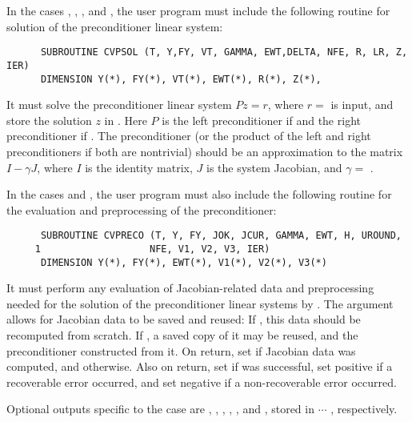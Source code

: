 \begin{enumerate}
\begin{itemize}
    In the cases , , , and , 
    the user program must include the following routine for solution of the preconditioner
    linear system:
\begin{verbatim}
      SUBROUTINE CVPSOL (T, Y,FY, VT, GAMMA, EWT,DELTA, NFE, R, LR, Z, IER)
      DIMENSION Y(*), FY(*), VT(*), EWT(*), R(*), Z(*),
\end{verbatim}
    It must solve the preconditioner linear system $Pz = r$, where $r =$  
    is input, and store the solution $z$ in . Here $P$ is the left 
    preconditioner if  and the right preconditioner if .  
    The preconditioner (or the product of the left and right preconditioners 
    if both are nontrivial) should be an  approximation to the matrix 
    $I - \gamma J$, where $I$ is the identity matrix, $J$ is the system Jacobian,
    and $\gamma =$ .
    
    In the cases  and , the user program must also include
    the following routine for the evaluation and preprocessing of the preconditioner:
\begin{verbatim}
      SUBROUTINE CVPRECO (T, Y, FY, JOK, JCUR, GAMMA, EWT, H, UROUND, 
     1                   NFE, V1, V2, V3, IER)
      DIMENSION Y(*), FY(*), EWT(*), V1(*), V2(*), V3(*) 
\end{verbatim}
    It must perform any evaluation of Jacobian-related data and preprocessing needed
    for the solution of the preconditioner linear systems by .
    The  argument allows for Jacobian data to be saved and reused:  If 
    , this data should be recomputed from scratch. If , a saved
    copy of it may be reused, and the preconditioner constructed from it.
    On return, set  if Jacobian data was computed, and  otherwise.
    Also on return, set  if  was successful, set 
    positive if a recoverable error occurred, and set  negative if a 
    non-recoverable error occurred.
    
    Optional outputs specific to the {\spgmr} case are , , , 
    , , and , stored in  $\cdots$ , 
    respectively.
    

\end{itemize}
\end{enumerate}
